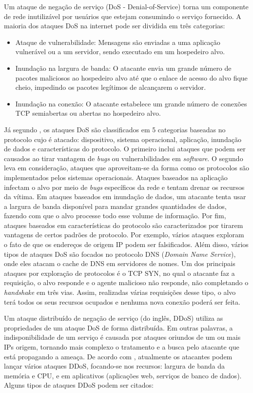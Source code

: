 Um ataque de negação de serviço (DoS - Denial-of-Service) torna um componente de rede inutilizável por usuários que estejam consumindo o serviço fornecido. A maioria dos ataques DoS na internet pode ser dividida em três categorias: \cite{kurose}
\begin{itemize}
	\item Ataque de vulnerabilidade: Mensagens são enviadas a uma aplicação vulnerável ou a um servidor, sendo executado em um hospedeiro alvo.
	\item Inundação na largura de banda: O atacante envia um grande número de pacotes maliciosos ao hospedeiro alvo até que o enlace de acesso do alvo fique cheio, impedindo os pacotes legítimos de alcançarem o servidor. 
	\item Inundação na conexão: O atacante estabelece um grande número de conexões TCP semiabertas ou abertas no hospedeiro alvo. 
\end{itemize}
Já segundo , os ataques DoS são classificados em 5 categorias baseadas no protocolo cujo é atacado: dispositivo, sistema operacional, aplicação, inundação de dados e características do protocolo. O primeiro inclui ataques que podem ser causados ao tirar vantagem de \textit{bugs} ou vulnerabilidades em \textit{software}. O segundo leva em consideração, ataques que aproveitam-se da forma como os protocolos são implementados pelos sistemas operacionais. Ataques baseados na aplicação infectam o alvo por meio de \textit{bugs} específicos da rede e tentam drenar os recursos da vítima. Em ataques baseados em inundação de dados, um atacante tenta usar a largura de banda disponível para mandar grandes quantidades de dados, fazendo com que o alvo processe todo esse volume de informação. Por fim, ataques baseados em características do protocolo são caracterizados por tirarem vantagens de certos padrões de protocolo. Por exemplo, vários ataques exploram o fato de que os endereços de origem IP podem ser falsificados. Além disso, vários tipos de ataques DoS são focados no protocolo DNS (\textit{Domain Name Service}), onde eles atacam o cache de DNS em servidores de nomes. Um dos principais ataques por exploração de protocolos é o TCP SYN, no qual o atacante faz a requisição, o alvo responde e o agente malicioso não responde, não completando o \textit{handshake} em três vias. Assim, realizadas várias requisições desse tipo, o alvo terá todos os seus recursos ocupados e nenhuma nova conexão poderá ser feita. 
 
Um ataque distribuído de negação de serviço (do inglês, DDoS) utiliza as propriedades de um ataque DoS de forma distribuída. Em outras palavras, a indisponibilidade de um serviço é causada por ataques oriundos de um ou mais IPs origem, tornando mais complexo o tratamento e a busca pelo atacante que está propagando a ameaça. De acordo com , atualmente os atacantes podem lançar vários ataques DDoS, focando-se nos recursos: largura de banda da memória e CPU, e em aplicativos (aplicações web, serviços de banco de dados). Alguns tipos de ataques DDoS podem ser citados:\cite{DataMining}

